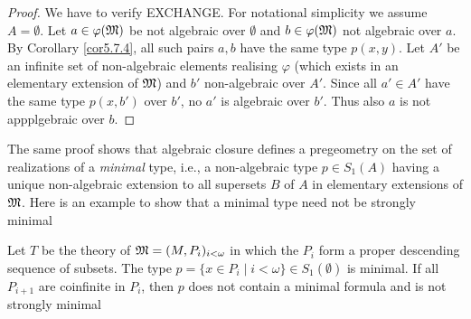 \documentclass[11pt]{article}
\begin{document}
\begin{proof}
We have to verify EXCHANGE.
For notational simplicity we assume \(A=\emptyset\).
Let \(a\in\varphi(\mathfrak{M})\) be not algebraic over \(\emptyset\) and \(b\in\varphi(\mathfrak{M})\) not algebraic over \(a\).
By Corollary \ref{cor5.7.4}, all such pairs \(a,b\) have the same type \(p(x,y)\). Let \(A'\) be
an infinite set of non-algebraic elements realising \(\varphi\) (which exists in an elementary extension
of \(\mathfrak{M}\))
and \(b'\) non-algebraic over \(A'\).
Since all \(a'\in A'\) have the same
type \(p(x,b')\) over \(b'\), no \(a'\) is algebraic over \(b'\).
Thus also \(a\) is not
appplgebraic over \(b\).
\end{proof}

The same proof shows that algebraic closure defines a pregeometry on the set of realizations of
a \emph{minimal} type, i.e., a non-algebraic type \(p\in S_1(A)\) having a unique non-algebraic extension
to all supersets \(B\) of \(A\) in elementary extensions of \(\mathfrak{M}\). Here is an example to show
that a minimal type need not be strongly minimal

Let \(T\) be the theory of \(\mathfrak{M}=(M,P_i)_{i<\omega}\) in which the \(P_i\) form a proper descending
sequence of subsets. The type \(p=\{x\in P_i\mid i<\omega\}\in S_1(\emptyset)\) is minimal. If all \(P_{i+1}\) are
coinfinite in \(P_i\), then \(p\) does not contain a minimal formula and is not strongly minimal
\end{document}
